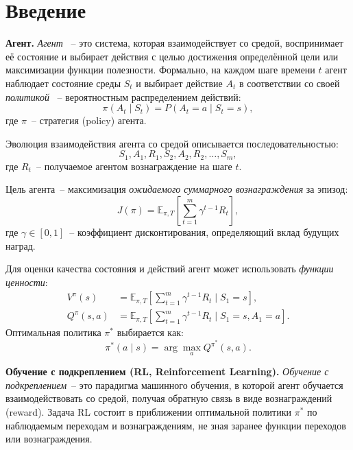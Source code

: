 \documentclass[11pt]{extarticle}
\begin{document}
\section*{Введение}

\textbf{Агент.}
\emph{Агент} ~-- это система, которая взаимодействует со средой, воспринимает её состояние и выбирает действия с целью достижения определённой цели или максимизации функции полезности. 
Формально, на каждом шаге времени $t$ агент наблюдает состояние среды $S_t$ и выбирает действие $A_t$ в соответствии со своей \emph{политикой} ~-- вероятностным распределением действий:
\begin{equation}
\pi(A_t \mid S_t) = P(A_t = a \mid S_t = s),
\end{equation}
где $\pi$~-- стратегия (policy) агента.  

Эволюция взаимодействия агента со средой описывается последовательностью:
\begin{equation}
S_1, A_1, R_1, S_2, A_2, R_2, \dots, S_m,
\end{equation}
где $R_t$~-- получаемое агентом вознаграждение на шаге $t$.  

Цель агента~-- максимизация \emph{ожидаемого суммарного вознаграждения} за эпизод:
\begin{equation}
J(\pi) = \mathbb{E}_{\pi, T}\left[\sum_{t=1}^{m} \gamma^{t-1} R_t\right],
\end{equation}
где $\gamma \in [0,1]$~-- коэффициент дисконтирования, определяющий вклад будущих наград.

Для оценки качества состояния и действий агент может использовать \emph{функции ценности}:
\begin{align}
V^{\pi}(s) &= \mathbb{E}_{\pi, T}\!\left[\sum_{t=1}^{m} \gamma^{t-1} R_t \mid S_1 = s\right], \\
Q^{\pi}(s,a) &= \mathbb{E}_{\pi, T}\!\left[\sum_{t=1}^{m} \gamma^{t-1} R_t \mid S_1 = s, A_1 = a\right].
\end{align}
Оптимальная политика $\pi^*$ выбирается как:
\begin{equation}
\pi^*(a \mid s) = \arg\max_{a} Q^{\pi^*}(s,a).
\end{equation}

\textbf{Обучение с подкреплением (RL, Reinforcement Learning).}
\emph{Обучение с подкреплением}~-- это парадигма машинного обучения, в которой агент обучается взаимодействовать со средой, получая обратную связь в виде вознаграждений (reward). 
Задача RL состоит в приближении оптимальной политики $\pi^*$ по наблюдаемым переходам и вознаграждениям, не зная заранее функции переходов или вознаграждения.
\end{document}
